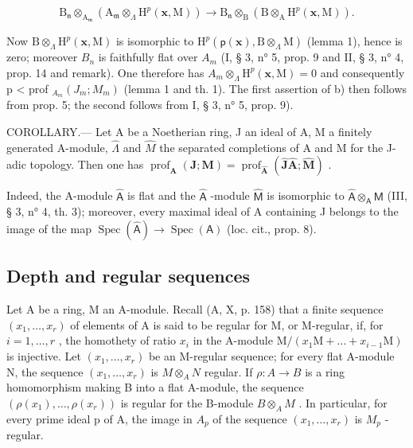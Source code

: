 \[
\mathrm{B} _ {\mathfrak {n}} \otimes_ {\mathrm{A} _ {\mathfrak {m}}} \left(\mathrm{A} _ {\mathfrak {m}} \otimes_ {\Lambda} \mathrm{H} ^ {p} (\mathbf {x}, \mathrm{M})\right) \longrightarrow \mathrm{B} _ {\mathfrak {n}} \otimes_ {\mathrm{B}} \left(\mathrm{B} \otimes_ {\mathrm{A}} \mathrm{H} ^ {p} (\mathbf {x}, \mathrm{M})\right).
\]

Now \(\mathrm{B}\otimes_{\Lambda}\mathrm{H}^{p}(\mathbf{x},\mathrm{M})\) is isomorphic to \(\mathrm{H}^{p}(\mathsf{p}(\mathbf{x}),\mathrm{B}\otimes_{\Lambda}\mathrm{M})\) (lemma 1), hence is zero; moreover \(B_{n}\) is faithfully flat over \(A_{m}\) (I, § 3, n° 5, prop. 9 and II, § 3, n° 4, prop. 14 and remark). One therefore has \(A_{m}\otimes_{\Lambda}\mathrm{H}^{p}(\mathbf{x},\mathrm{M})=0\) and consequently p \textless{} prof \(_{A_{m}}(J_{m};M_{m})\) (lemma 1 and th. 1). The first assertion of b) then follows from prop. 5; the second follows from I, § 3, n° 5, prop. 9).

COROLLARY.--- Let A be a Noetherian ring, J an ideal of A, M a finitely generated A-module, \(\widehat{\Lambda}\) and \(\widehat{M}\) the separated completions of A and M for the J-adic topology. Then one has \(\operatorname{prof}_{\mathbf{A}}(\mathbf{J};\mathbf{M}) = \operatorname{prof}_{\widehat{\mathbf{A}}}(\widehat{\mathbf{J}}\widehat{\mathbf{A}};\widehat{\mathbf{M}})\) .

Indeed, the A-module \(\widehat{\mathsf{A}}\) is flat and the \(\widehat{\mathsf{A}}\) -module \(\widehat{\mathsf{M}}\) is isomorphic to \(\widehat{\mathsf{A}}\otimes_{\mathsf{A}}\mathsf{M}\) (III, § 3, n° 4, th. 3); moreover, every maximal ideal of A containing J belongs to the image of the map \(\operatorname{Spec}(\widehat{\mathsf{A}})\to\operatorname{Spec}(\mathsf{A})\) (loc. cit., prop. 8).

\subsection{Depth and regular sequences}

Let A be a ring, M an A-module. Recall (A, X, p. 158) that a finite sequence \((x_{1},\ldots,x_{r})\) of elements of A is said to be regular for M, or M-regular, if, for \(i=1,\ldots,r\) , the homothety of ratio \(x_{i}\) in the A-module \(\mathrm{M}/(x_{1}\mathrm{M}+\ldots+x_{i-1}\mathrm{M})\) is injective. Let \((x_{1},\ldots,x_{r})\) be an M-regular sequence; for every flat A-module N, the sequence \((x_{1},\ldots,x_{r})\) is \(M\otimes_{A}N\) regular. If \(\rho:A\to B\) is a ring homomorphism making B into a flat A-module, the sequence \((\rho(x_{1}),\ldots,\rho(x_{r}))\) is regular for the B-module \(B\otimes_{A}M\) . In particular, for every prime ideal p of A, the image in \(A_{p}\) of the sequence \((x_{1},\ldots,x_{r})\) is \(M_{p}\) -regular.

